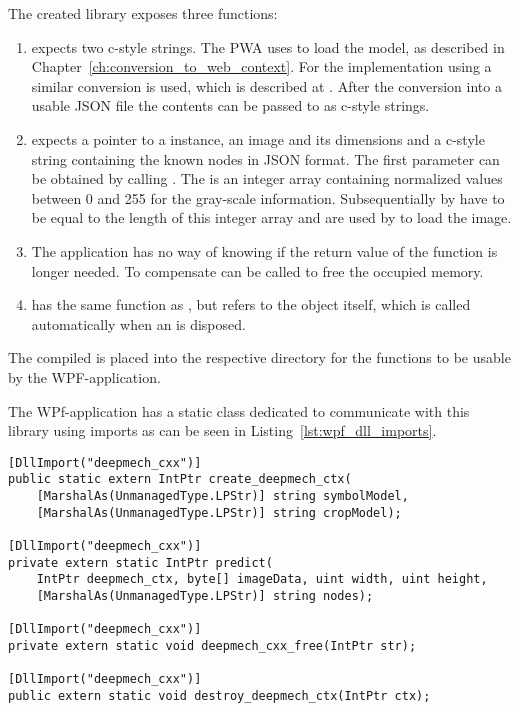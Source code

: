 The created library exposes three functions:
\begin{enumerate}
    \item {} expects two c-style strings.
        The PWA uses  to load the model, as described in Chapter~\ref{ch:conversion_to_web_context}.
        For the implementation using  a similar conversion is used, which is described at .
        After the conversion into a usable JSON file the contents can be passed to  as c-style strings.
    \item {} expects a pointer to a  instance, an image and its dimensions and a c-style string containing the known nodes in JSON format.
        The first parameter can be obtained by calling .
        The  is an integer array containing normalized values between 0 and 255 for the gray-scale information.
        Subsequentially  by  have to be equal to the length of this integer array and are used by  to load the image.
    \item The application has no way of knowing if the return value of the  function is longer needed.
        To compensate  can be called to free the occupied memory.
    \item {} has the same function as , but refers to the  object itself, which is called automatically when an  is disposed.
\end{enumerate}

The compiled  is placed into the respective directory for the functions to be usable by the WPF-application.

The WPf-application has a static class dedicated to communicate with this library using imports as can be seen in Listing~\ref{lst:wpf_dll_imports}.

\begin{lstlisting}[label={lst:wpf_dll_imports}, caption={DllImports in the static Deepmech\_cxx class}]
[DllImport("deepmech_cxx")]
public static extern IntPtr create_deepmech_ctx(
    [MarshalAs(UnmanagedType.LPStr)] string symbolModel,
    [MarshalAs(UnmanagedType.LPStr)] string cropModel);

[DllImport("deepmech_cxx")]
private extern static IntPtr predict(
    IntPtr deepmech_ctx, byte[] imageData, uint width, uint height,
    [MarshalAs(UnmanagedType.LPStr)] string nodes);

[DllImport("deepmech_cxx")]
private extern static void deepmech_cxx_free(IntPtr str);

[DllImport("deepmech_cxx")]
public extern static void destroy_deepmech_ctx(IntPtr ctx);
\end{lstlisting}

